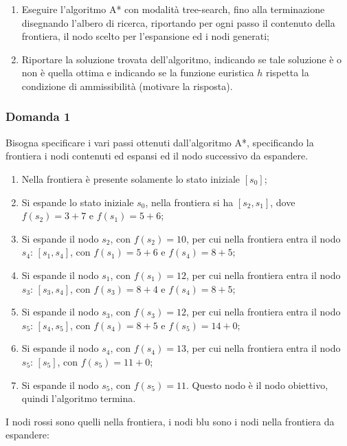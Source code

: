 \documentclass{article}
\numberwithin{equation}{section}
\begin{document}
\begin{enumerate}
    \item Eseguire l'algoritmo A* con modalità tree-search, fino alla terminazione disegnando l'albero di ricerca, riportando per ogni passo il 
contenuto della frontiera, il nodo scelto per l'espansione ed i nodi generati;
    \item Riportare la soluzione trovata dell'algoritmo, indicando se tale soluzione è o non è quella ottima e indicando se la funzione euristica 
$h$ rispetta la condizione di ammissibilità (motivare la risposta). 
\end{enumerate}

\subsubsection*{Domanda 1}

Bisogna specificare i vari passi ottenuti dall'algoritmo A*, specificando la frontiera i nodi contenuti ed espansi ed il nodo successivo 
da espandere.

\begin{enumerate}
    \item Nella frontiera è presente solamente lo stato iniziale $[s_0]$;
    \item Si espande lo stato iniziale $s_0$, nella frontiera si ha $[s_2,s_1]$, dove $f(s_2)=3+7$ e $f(s_1)=5+6$;
    \item Si espande il nodo $s_2$, con $f(s_2)=10$, per cui nella frontiera entra il nodo $s_4$: $[s_1,s_4]$, con $f(s_1)=5+6$ e $f(s_4)=8+5$;
    \item Si espande il nodo $s_1$, con $f(s_1)=12$, per cui nella frontiera entra il nodo $s_3$: $[s_3, s_4]$, con $f(s_3)=8+4$ e $f(s_4)=8+5$;
    \item Si espande il nodo $s_3$, con $f(s_3)=12$, per cui nella frontiera entra il nodo $s_5$: $[s_4, s_5]$, con $f(s_4)=8+5$ e $f(s_5)=14+0$;
    \item Si espande il nodo $s_4$, con $f(s_4)=13$, per cui nella frontiera entra il nodo $s_5$: $[s_5]$, con $f(s_5)=11+0$;
    \item Si espande il nodo $s_5$, con $f(s_5)=11$. Questo nodo è il nodo obiettivo, quindi l'algoritmo termina. 
\end{enumerate}


I nodi rossi sono quelli nella frontiera, i nodi blu sono i nodi nella frontiera da espandere:
\end{document}
